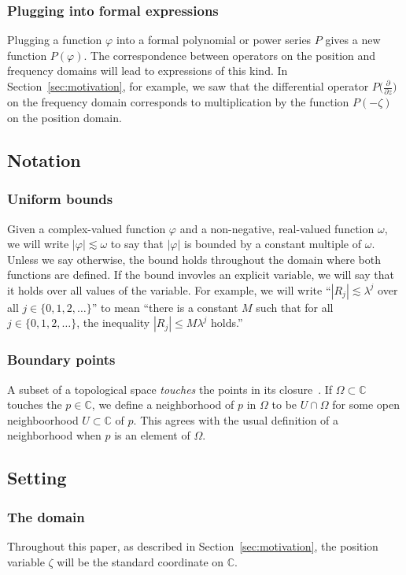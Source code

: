 \documentclass[review]{siamart220329}
\newcommand{\C}{\mathbb{C}}
\begin{document}
\subsubsection{Plugging into formal expressions}
Plugging a function $\varphi$ into a formal polynomial or power series $P$ gives a new function $P(\varphi)$. The correspondence between operators on the position and frequency domains will lead to expressions of this kind. In Section~\ref{sec:motivation}, for example, we saw that the differential operator $P\big(\tfrac{\partial}{\partial z}\big)$ on the frequency domain corresponds to multiplication by the function $P(-\zeta)$ on the position domain.\color{black}
\subsection{Notation}
\subsubsection{Uniform bounds}
Given a complex-valued function $\varphi$ and a non-negative, real-valued function $\omega$, we will write $|\varphi| \lesssim \omega$ to say that $|\varphi|$ is bounded by a constant multiple of $\omega$. Unless we say otherwise, the bound holds throughout the domain where both functions are defined. If the bound invovles an explicit variable, we will say that it holds over all values of the variable. For example, we will write ``$|R_j| \lesssim \lambda^j$ over all $j \in \{0, 1, 2, \ldots\}$'' to mean ``there is a constant $M$ such that for all $j \in \{0, 1, 2, \ldots\}$, the inequality $|R_j| \le M \lambda^j$ holds.''
\subsubsection{Boundary points}
A subset of a topological space {\em touches} the points in its closure~\cite[Chapter~5, Definition~2.11]{joshi1983gen-top}. If $\Omega \subset \C$ touches the $p \in \C$, we define a neighborhood of $p$ in $\Omega$ to be $U \cap \Omega$ for some open neighboorhood $U \subset \C$ of $p$. This agrees with the usual definition of a neighborhood when $p$ is an element of $\Omega$.

\subsection{Setting}\label{setting}
\subsubsection{The domain}\label{setting:domain}
Throughout this paper, as described in Section~\ref{sec:motivation}, the position variable $\zeta$ will be the standard coordinate on $\C$. 
\end{document}
